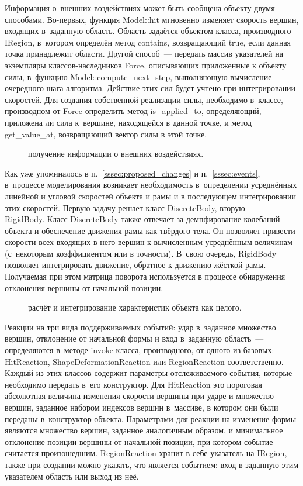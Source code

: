 \documentclass[a4paper, 14pt, titlepage]{extarticle}
\newcommand{\includefigure}[2]{
    \begin{figure}[!htb]
      \center{\texttt{[image: \#1]}}
      \caption{#2} \label{fig:#1}
    \end{figure}
  }
\begin{document}
        Информация о~внешних воздействиях может быть сообщена объекту двумя способами. Во-первых,
        функция Model::hit мгновенно изменяет скорость вершин, входящих в~заданную область. Область
        задаётся объектом класса, производного IRegion, в~котором определён метод contains,
        возвращающий true, если данная точка принадлежит области. Другой способ~--- передать массив указателей
        на экземпляры классов-наследников Force, описывающих приложенные к объекту силы, в~функцию
        Model::compute\_next\_step, выполняющую вычисление очередного шага алгоритма. Действие этих
        сил будет учтено при интегрировании скоростей. Для создания собственной реализации силы,
        необходимо в~классе, производном от Force определить метод is\_applied\_to, определяющий,
        приложена ли сила к~вершине, находящейся в данной точке, и метод get\_value\_at,
        возвращающий вектор силы в этой точке.

        \includefigure{core-interaction}{получение информации о внешних воздействиях.}

        Как уже упоминалось в п.~\ref{sssec:proposed_changes} и п.~\ref{sssec:events}, в~процессе
        моделирования возникает необходимость в~определении усреднённых линейной и угловой скоростей
        объекта и рамы и в последующем интегрировании этих скоростей. Первую задачу решает класс
        DiscreteBody, вторую~--- RigidBody. Класс DiscreteBody также отвечает за демпфирование колебаний
        объекта и обеспечение движения рамы как твёрдого тела. Он позволяет привести скорости всех
        входящих в него вершин к вычисленным усреднённым величинам (с~некоторым коэффициентом или в
        точности). В~свою очередь, RigidBody позволяет интегрировать движение, обратное
        к движению жёсткой рамы. Получаемая при этом матрица поворота используется в процессе
        обнаружения отклонения вершины от начальной позиции.

        \includefigure{core-bodies}{расчёт и интегрирование характеристик объекта как целого.}

        Реакции на три вида поддерживаемых событий: удар в~заданное множество вершин, отклонение от
        начальной формы и вход в~заданную область~--- определяются в~методе invoke класса,
        производного, от одного из базовых: HitReaction, ShapeDeformationReaction или RegionReaction
        соответственно. Каждый из этих классов содержит параметры отслеживаемого события, которые
        необходимо передать в~его конструктор. Для HitReaction это пороговая абсолютная величина
        изменения скорости вершины при ударе и множество вершин, заданное набором индексов вершин
        в~массиве, в котором они были переданы в~конструктор объекта. Параметрами для
        реакции на изменение формы являются множество вершин, заданное аналогичным образом, и минимальное
        отклонение позиции вершины от начальной позиции, при котором событие считается произошедшим.
        RegionReaction хранит в себе указатель на IRegion, также при создании можно указать, что
        является событием: вход в заданную этим указателем область или выход из неё.
\end{document}
